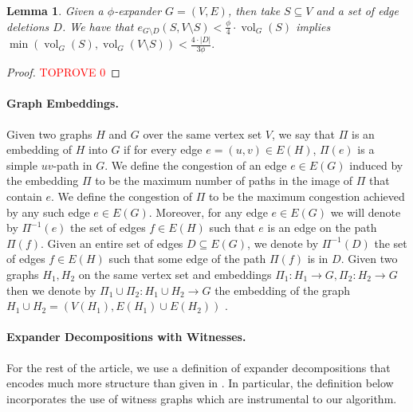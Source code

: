 \documentclass[11pt]{article}
\newtheorem{lemma}[theorem]{Lemma}
\begin{document}
\begin{lemma} \label{lm:helper}
    Given a $\phi$-expander $G=(V,E)$, then take $S \subseteq V$ and a set of edge deletions $D$. We have that $e_{G \setminus {D}}(S, V \setminus S)  < \frac{\phi}{4} \cdot \operatorname{vol}_G(S)$ implies $\min(\operatorname{vol}_G(S), \operatorname{vol}_G(V \setminus S)) < \frac{4\cdot |D|}{3\phi}.$
\end{lemma}
\begin{proof}\textcolor{red}{TOPROVE 0}\end{proof}

\paragraph{Graph Embeddings.} Given two graphs $H$ and $G$ over the same vertex set $V$, we say that $\Pi$ is an embedding of $H$ into $G$ if for every edge $e = (u,v) \in E(H)$, $\Pi(e)$ is a simple $uv$-path in $G$. We define the congestion of an edge $e \in E(G)$ induced by the embedding $\Pi$ to be the maximum number of paths in the image of $\Pi$ that contain $e$. We define the congestion of $\Pi$ to be the maximum congestion achieved by any such edge $e \in E(G)$. 
Moreover, for any edge $e \in E(G)$ we will denote by $\Pi^{-1}(e)$ the set of edges $f \in E(H)$ such that $e$ is an edge on the path $\Pi(f)$. Given an entire set of edges $D \subseteq E(G)$, we denote by $\Pi^{-1}(D)$ the set of edges $f \in E(H)$ such that some edge of the path $\Pi(f)$ is in $D$. Given two graphs $H_1, H_2$ on the same vertex set and embeddings $\Pi_1 : H_1 \rightarrow G, \Pi_2 : H_2 \rightarrow G$ then we denote by $\Pi_1 \cup \Pi_2 : H_1 \cup H_2 \rightarrow G$ the embedding of the graph $H_1 \cup H_2 = (V(H_1), E(H_1) \cup E(H_2))$ .

\paragraph{Expander Decompositions with Witnesses.} For the rest of the article, we use a definition of expander decompositions that encodes much more structure than given in . In particular, the definition below incorporates the use of witness graphs which are instrumental to our algorithm. 
\end{document}
